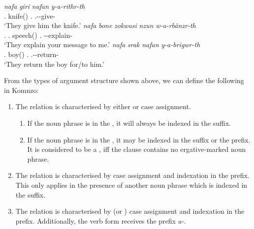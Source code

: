 \begin{exe}
\ex
\label{ex755}
\begin{xlist}
	\ex %
	\gll \emph{nafa} \emph{giri} \emph{nafan} \emph{y-a-rithr-th}\\
	\Tpl{}.\Erg{} knife(\Abs) \Tsg.\Dat{} \Tsg.\Masc-\Vc-give-\Tpl{}\\
	\trans `They give him the knife.'
	\label{ex756}
	\ex %
	\gll \emph{nafa} \emph{bone} \emph{zokwasi} \emph{nzun} \emph{w-a-rbänzr-th}\\
	\Tpl{}.\Erg{} \Ssg.\Poss{} speech(\Abs) \Fsg.\Dat{} \Fsg-\Vc-explain-\Tpl{}\\
	\trans `They explain your message to me.'
	\label{ex757}
	\ex %
	\gll \emph{nafa} \emph{srak} \emph{nafan} \emph{y-a-brigwr-th}\\
	\Tpl{}.\Erg{} boy(\Abs) \Tsg.\Dat{} \Tsg.\Masc-\Vc-return-\Tpl{}\\
	\trans `They return the boy for/to him.'
	\label{ex758}
\end{xlist}
\end{exe}

From the types of argument structure shown above, we can define the following  in Komnzo:

\begin{enumerate}
	\item The  relation is characterised by either  or  case assignment.
	\begin{enumerate}
		\item If the noun phrase is in the , it will always be indexed in the suffix.
		\item If the noun phrase is in the , it may be indexed in the suffix or the prefix. It is considered to be a , iff the clause contains no ergative-marked noun phrase.
	\end{enumerate}
	\item The  relation is characterised by  case assignment and indexation in the prefix. This only applies in the presence of another  noun phrase which is indexed in the suffix.
	\item The  relation is characterised by  (or ) case assignment and indexation in the prefix. Additionally, the verb form receives the  prefix \emph{a-}.
\end{enumerate}%

